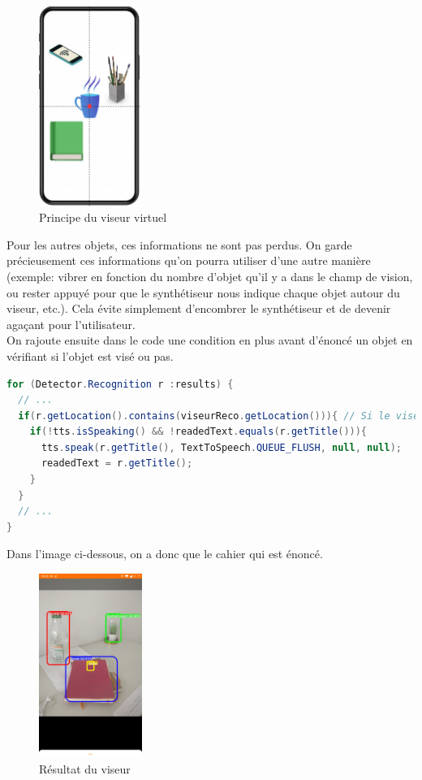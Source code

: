\documentclass[UTF8]{EPURapport}
\begin{document}
\begin{figure}[h!]
\centering
  \includegraphics[width=0.3\textwidth]{images/viseur.png}
  \caption{Principe du viseur virtuel}
  \label{fig:viseur}
\end{figure}

Pour les autres objets, ces informations ne sont pas perdus. On garde précieusement ces informations qu'on pourra utiliser d'une autre manière (exemple: vibrer en fonction du nombre d'objet qu'il y a dans le champ de vision, ou rester appuyé pour que le synthétiseur nous indique chaque objet autour du viseur, etc.). Cela évite simplement d'encombrer le synthétiseur et de devenir agaçant pour l'utilisateur.\\

On rajoute ensuite dans le code une condition en plus avant d'énoncé un objet en vérifiant si l'objet est visé ou pas.\\

\begin{lstlisting}[language=Java]
for (Detector.Recognition r :results) {
  // ...
  if(r.getLocation().contains(viseurReco.getLocation())){ // Si le viseur est dans l'objet detecte
    if(!tts.isSpeaking() && !readedText.equals(r.getTitle())){
      tts.speak(r.getTitle(), TextToSpeech.QUEUE_FLUSH, null, null);
      readedText = r.getTitle();
    }
  }
  // ...
}
\end{lstlisting}

\newpage
Dans l'image ci-dessous, on a donc que le cahier qui est énoncé.\\

\begin{figure}[h!]
\centering
  \includegraphics[width=0.3\textwidth]{images/viseurapp.jpg}
  \caption[]{Résultat du viseur \footnotemark}
  \label{fig:viseurapp}
\end{figure}
\end{document}

